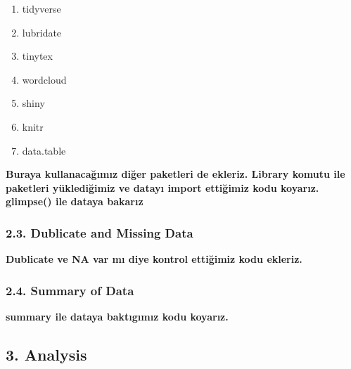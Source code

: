 \documentclass[
]{article}
\providecommand{\tightlist}{%
  \setlength{\itemsep}{0pt}\setlength{\parskip}{0pt}}
\begin{document}
\begin{enumerate}
\def\labelenumi{\arabic{enumi}.}
\tightlist
\item
  tidyverse
\item
  lubridate
\item
  tinytex
\item
  wordcloud
\item
  shiny
\item
  knitr
\item
  data.table
\end{enumerate}

\textbf{Buraya kullanacağımız diğer paketleri de ekleriz. Library komutu
ile paketleri yüklediğimiz ve datayı import ettiğimiz kodu koyarız.
glimpse() ile dataya bakarız}

\hypertarget{dublicate-and-missing-data}{%
\subsubsection{2.3. Dublicate and Missing
Data}\label{dublicate-and-missing-data}}

\textbf{Dublicate ve NA var mı diye kontrol ettiğimiz kodu ekleriz. }

\hypertarget{summary-of-data}{%
\subsubsection{2.4. Summary of Data}\label{summary-of-data}}

\textbf{summary ile dataya baktıgımız kodu koyarız.}

\hypertarget{analysis}{%
\subsection{3. Analysis}\label{analysis}}
\end{document}

